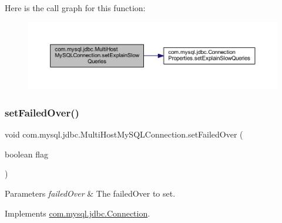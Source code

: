 Here is the call graph for this function\+:
\nopagebreak
\begin{figure}[H]
\begin{center}
\leavevmode
\includegraphics[width=350pt]{classcom_1_1mysql_1_1jdbc_1_1_multi_host_my_s_q_l_connection_aae6e6a98dc0bdfbf91fd7e5eecb0e1ca_cgraph}
\end{center}
\end{figure}
\mbox{\label{classcom_1_1mysql_1_1jdbc_1_1_multi_host_my_s_q_l_connection_af950571e47bab54277504fca71cbefd5}} 
\subsubsection{\texorpdfstring{set\+Failed\+Over()}{setFailedOver()}}
{\footnotesize\ttfamily void com.\+mysql.\+jdbc.\+Multi\+Host\+My\+S\+Q\+L\+Connection.\+set\+Failed\+Over (\begin{DoxyParamCaption}\item[{boolean}]{flag }\end{DoxyParamCaption})}


\begin{DoxyParams}{Parameters}
{\em failed\+Over} & The failed\+Over to set. \\
\hline
\end{DoxyParams}


Implements \mbox{\hyperlink{interfacecom_1_1mysql_1_1jdbc_1_1_connection_af1a58f95720963635270b83f16d558b0}{com.\+mysql.\+jdbc.\+Connection}}.

